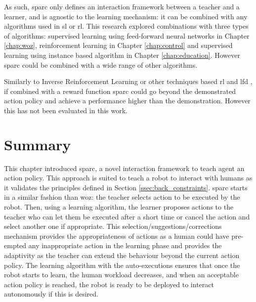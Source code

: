 As such, \gls{sparc} only defines an interaction framework between a teacher and a learner, and is agnostic to the learning mechanism: it can be combined with any algorithms used in \acrlong{sl} or \acrlong{rl}. This research explored combinations with three types of algorithms: supervised learning using feed-forward neural networks in Chapter \ref{chap:woz}, reinforcement learning in Chapter \ref{chap:control} and supervised learning using instance based algorithm in Chapter \ref{chap:education}. However \gls{sparc} could be combined with a wide range of other algorithms.


Similarly to Inverse Reinforcement Learning \citep{abbeel2004apprenticeship} or other techniques based \gls{rl} and \gls{lfd} \citep{billard2008robot}, if combined with a reward function \gls{sparc} could go beyond the demonstrated action policy and achieve a performance higher than the demonstration. However this has not been evaluated in this work.

\section{Summary}
    
This chapter introduced \acrfull{sparc}, a novel interaction framework to teach agent an action policy. This approach is suited to teach a robot to interact with humans as it validates the principles defined in Section \ref{ssec:back_constraints}. \gls{sparc} starts in a similar fashion than \gls{woz}: the teacher selects action to be executed by the robot. Then, using a learning algorithm, the learner proposes actions to the teacher who can let them be executed after a short time or cancel the action and select another one if appropriate. This selection/suggestions/corrections mechanism provides the appropriateness of actions as a human could have pre-empted any inappropriate action in the learning phase and provides the adaptivity as the teacher can extend the behaviour beyond the current action policy. The learning algorithm with the auto-executions ensures that once the robot starts to learn, the human workload decreases, and when an acceptable action policy is reached, the robot is ready to be deployed to interact autonomously if this is desired.

